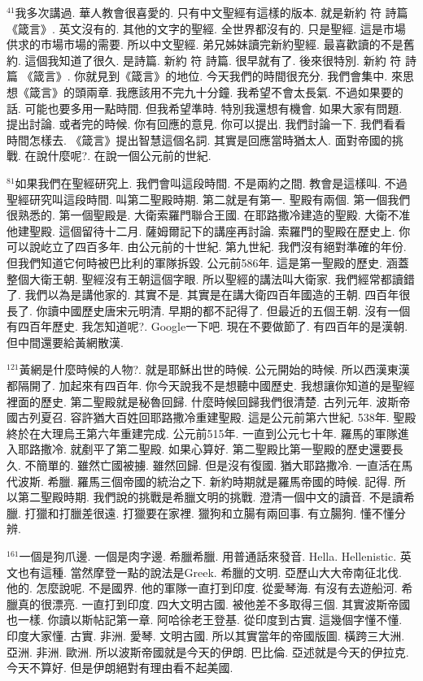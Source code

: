 \documentclass{book}
\begin{document}
$^{41}$我多次講過.
華人教會很喜愛的.
只有中文聖經有這樣的版本.
就是新約 符 詩篇 《箴言》.
英文沒有的.
其他的文字的聖經.
全世界都沒有的.
只是聖經.
這是市場供求的市場市場的需要.
所以中文聖經.
弟兄姊妹讀完新約聖經.
最喜歡讀的不是舊約.
這個我知道了很久.
是詩篇.
新約 符 詩篇.
很早就有了.
後來很特別.
新約 符 詩篇 《箴言》.
你就見到《箴言》的地位.
今天我們的時間很充分.
我們會集中.
來思想《箴言》的頭兩章.
我應該用不完九十分鐘.
我希望不會太長氣.
不過如果要的話.
可能也要多用一點時間.
但我希望準時.
特別我還想有機會.
如果大家有問題.
提出討論.
或者完的時候.
你有回應的意見.
你可以提出.
我們討論一下.
我們看看時間怎樣去.
《箴言》提出智慧這個名詞.
其實是回應當時猶太人.
面對帝國的挑戰.
在說什麼呢?.
在說一個公元前的世紀.

$^{81}$如果我們在聖經研究上.
我們會叫這段時間.
不是兩約之間.
教會是這樣叫.
不過聖經研究叫這段時間.
叫第二聖殿時期.
第二就是有第一.
聖殿有兩個.
第一個我們很熟悉的.
第一個聖殿是.
大衛索羅門聯合王國.
在耶路撒冷建造的聖殿.
大衛不准他建聖殿.
這個留待十二月.
薩姆爾記下的講座再討論.
索羅門的聖殿在歷史上.
你可以說屹立了四百多年.
由公元前的十世紀.
第九世紀.
我們沒有絕對準確的年份.
但我們知道它何時被巴比利的軍隊拆毀.
公元前586年.
這是第一聖殿的歷史.
涵蓋整個大衛王朝.
聖經沒有王朝這個字眼.
所以聖經的講法叫大衛家.
我們經常都讀錯了.
我們以為是講他家的.
其實不是.
其實是在講大衛四百年國造的王朝.
四百年很長了.
你讀中國歷史唐宋元明清.
早期的都不記得了.
但最近的五個王朝.
沒有一個有四百年歷史.
我怎知道呢?.
Google一下吧.
現在不要做節了.
有四百年的是漢朝.
但中間還要給黃網散漢.

$^{121}$黃網是什麼時候的人物?.
就是耶穌出世的時候.
公元開始的時候.
所以西漢東漢都隔開了.
加起來有四百年.
你今天說我不是想聽中國歷史.
我想讓你知道的是聖經裡面的歷史.
第二聖殿就是秘魯回歸.
什麼時候回歸我們很清楚.
古列元年.
波斯帝國古列夏召.
容許猶大百姓回耶路撒冷重建聖殿.
這是公元前第六世紀.
538年.
聖殿終於在大理烏王第六年重建完成.
公元前515年.
一直到公元七十年.
羅馬的軍隊進入耶路撒冷.
就剷平了第二聖殿.
如果心算好.
第二聖殿比第一聖殿的歷史還要長久.
不簡單的.
雖然亡國被擄.
雖然回歸.
但是沒有復國.
猶大耶路撒冷.
一直活在馬代波斯.
希臘.
羅馬三個帝國的統治之下.
新約時期就是羅馬帝國的時候.
記得.
所以第二聖殿時期.
我們說的挑戰是希臘文明的挑戰.
澄清一個中文的讀音.
不是讀希臘.
打獵和打臘差很遠.
打獵要在家裡.
獵狗和立腸有兩回事.
有立腸狗.
懂不懂分辨.

$^{161}$一個是狗爪邊.
一個是肉字邊.
希臘希臘.
用普通話來發音.
Hella.
Hellenistic.
英文也有這種.
當然摩登一點的說法是Greek.
希臘的文明.
亞歷山大大帝南征北伐.
他的.
怎麼說呢.
不是國界.
他的軍隊一直打到印度.
從愛琴海.
有沒有去遊船河.
希臘真的很漂亮.
一直打到印度.
四大文明古國.
被他差不多取得三個.
其實波斯帝國也一樣.
你讀以斯帖記第一章.
阿哈徐老王登基.
從印度到古實.
這幾個字懂不懂.
印度大家懂.
古實.
非洲.
愛琴.
文明古國.
所以其實當年的帝國版圖.
橫跨三大洲.
亞洲.
非洲.
歐洲.
所以波斯帝國就是今天的伊朗.
巴比倫.
亞述就是今天的伊拉克.
今天不算好.
但是伊朗絕對有理由看不起美國.
\end{document}
